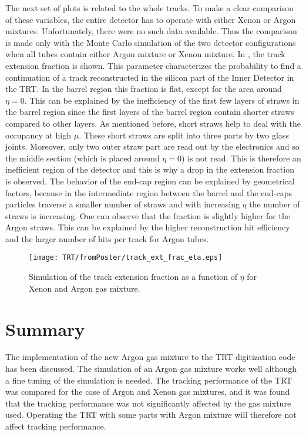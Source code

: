 The next set of plots is related to the whole tracks. To make a clear comparison of these variables, the entire detector has to operate with either Xenon or Argon mixtures.
Unfortunately, there were no such data available. Thus the comparison is made only with the Monte Carlo simulation of the two detector configurations when all tubes contain either Argon mixture or Xenon mixture. In , the track extension fraction is shown. This parameter characterizes
the probability to find a continuation of a track reconstructed in the silicon part of the Inner Detector in the TRT.
In the barrel region this fraction is flat, except for the area around $\eta = 0$. This can be explained by the inefficiency of the first few layers of straws in the barrel region
since the first layers of the barrel region contain shorter straws compared to other layers. 
As mentioned before, short straws help to deal with the occupancy at high $\mu$.
These short straws are split into three parts by two glass joints. Moreover, only two outer straw part are read out by the electronics and so the middle section (which is placed around $\eta=0$) is not read. This is therefore an inefficient region of the detector and this is why a drop in the extension fraction is observed.
The behavior of the end-cap region can be explained by geometrical factors, because in the intermediate region between the barrel and the end-caps particles
traverse a smaller number of straws and with increasing $\eta$ the number of straws is increasing.
One can observe that the fraction is slightly higher for the Argon straws. This can be explained by the higher reconstruction hit efficiency and the larger number of hits per
track for Argon tubes.

\begin{figure}
\begin{center}
 \texttt{[image: TRT/fromPoster/track\_ext\_frac\_eta.eps]}
\caption{Simulation of the track extension fraction as a function of $\eta$ for Xenon and Argon gas mixture.}
\label{fig:track_ext_fraction}
\end{center}
\end{figure}

\section{Summary}
\label{sec:trt_summary}

The implementation of the new Argon gas mixture to the TRT digitization code has been discussed. The simulation of an Argon gas mixture works well although 
a fine tuning of the simulation is needed.
The tracking performance of the TRT was compared for the case of Argon and Xenon gas mixtures, and it was found that the tracking performance was not significantly affected
by the gas mixture used. Operating the TRT with some parts with Argon mixture will therefore not affect tracking performance.



